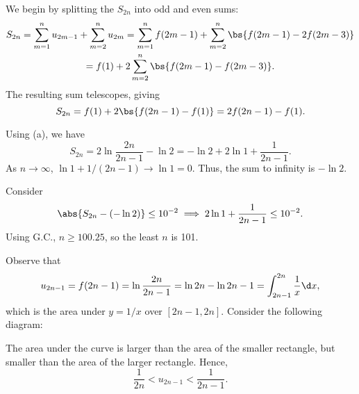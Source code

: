 \begin{solution}
    \begin{ppart}
        We begin by splitting the $S_{2n}$ into odd and even sums:
        \begin{gather*}
            S_{2n} = \sum_{m = 1}^{n} u_{2m-1} + \sum_{m = 2}^n u_{2m} = \sum_{m = 1}^n f(2m-1) + \sum_{m = 2}^n \bs{f(2m-1) - 2f(2m-3)}\\
            = f(1) + 2\sum_{m = 2}^n \bs{f(2m-1) - f(2m-3)}.
        \end{gather*}
        The resulting sum telescopes, giving \[S_{2n} = f(1) + 2\bs{f(2n-1) - f(1)} = 2f(2n-1) - f(1).\]
    \end{ppart}
    \begin{ppart}
        Using (a), we have \[S_{2n} = 2\ln{\frac{2n}{2n-1}} - \ln 2 = -\ln 2 + 2\ln{1 + \frac1{2n-1}}.\] As $n \to \infty$, $\ln{1 + 1/(2n-1)} \to \ln 1 = 0$. Thus, the sum to infinity is $-\ln 2$.
    \end{ppart}
    \begin{ppart}
        Consider \[\abs{S_{2n} - (-\ln 2)} \leq 10^{-2} \implies 2\ln{1 + \frac1{2n-1}} \leq 10^{-2}.\] Using G.C., $n \geq 100.25$, so the least $n$ is 101.
    \end{ppart}
    \begin{ppart}
        Observe that \[u_{2n-1} = f(2n-1) = \ln{\frac{2n}{2n-1}} = \ln{2n} - \ln{2n-1} = \int_{2n-1}^{2n} \frac1x \d x,\] which is the area under $y = 1/x$ over $[2n-1, 2n]$. Consider the following diagram:
        \begin{figure}[H]
            \centering
        \end{figure}
        The area under the curve is larger than the area of the smaller rectangle, but smaller than the area of the larger rectangle. Hence, \[\frac1{2n} < u_{2n-1} < \frac1{2n-1}.\]
    \end{ppart}
\end{solution}

